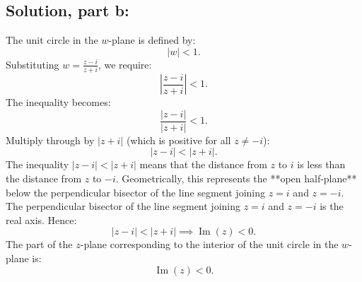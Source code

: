 \documentclass[12pt]{article}
\begin{document}
    \subsection*{Solution, part b:}
        The unit circle in the \(w\)-plane is defined by:
        \[
        |w| < 1.
        \]
        Substituting \(w = \frac{z-i}{z+i}\), we require:
        \[
        \left|\frac{z-i}{z+i}\right| < 1.
        \]
        The inequality becomes:
        \[
        \frac{|z-i|}{|z+i|} < 1.
        \]
        Multiply through by \(|z+i|\) (which is positive for all \(z \neq -i\)):
        \[
        |z-i| < |z+i|.
        \]
        The inequality \( |z-i| < |z+i| \) means that the distance from \(z\) to \(i\) is less than the distance from \(z\) to \(-i\). Geometrically, this represents the **open half-plane** below the perpendicular bisector of the line segment joining \(z = i\) and \(z = -i\).
        The perpendicular bisector of the line segment joining \(z = i\) and \(z = -i\) is the real axis. Hence:
        \[
        |z-i| < |z+i| \implies \operatorname{Im}(z) < 0.
        \]
        The part of the \(z\)-plane corresponding to the interior of the unit circle in the \(w\)-plane is:
        \[
        \boxed{\operatorname{Im}(z) < 0}.
        \]
\end{document}
